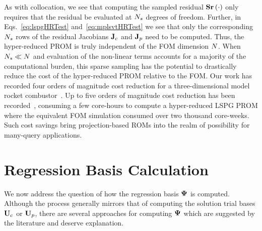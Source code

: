 As with collocation, we see that computing the sampled residual $\mathbf{S} \mathbf{r}\left(\cdot\right)$ only requires that the residual be evaluated at $N_s$ degrees of freedom. Further, in Eqs.~\ref{eq:lspgHRTest} and~\ref{eq:mplsvtHRTest} we see that only the corresponding $N_s$ rows of the residual Jacobians $\mathbf{J}_{c} $ and $\mathbf{J}_{p}$ need to be computed. Thus, the hyper-reduced PROM is truly independent of the FOM dimension $N$. When $N_s \ll N$ and evaluation of the non-linear terms accounts for a majority of the computational burden, this sparse sampling has the potential to drastically reduce the cost of the hyper-reduced PROM relative to the FOM. Our work has recorded four orders of magnitude cost reduction for a three-dimensional model rocket combustor~\cite{Wentland2021}. Up to five orders of magnitude cost reduction has been recorded~\cite{Grimberg2021}, consuming a few core-hours to compute a hyper-reduced LSPG PROM where the equivalent FOM simulation consumed over two thousand core-weeks. Such cost savings bring projection-based ROMs into the realm of possibility for many-query applications.

\section{Regression Basis Calculation}\label{subsec:regBasis}
%
We now address the question of how the regression basis $\deimBasis$ is computed. Although the process generally mirrors that of computing the solution trial bases $\consTrial$ or $\primTrial$, there are several approaches for computing $\deimBasis$ which are suggested by the literature and deserve explanation.

